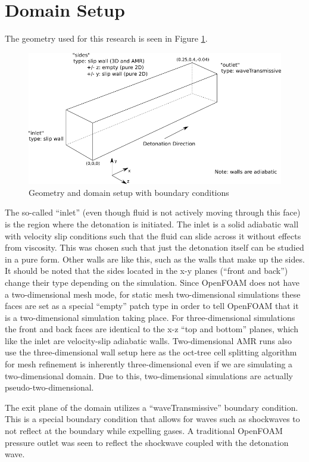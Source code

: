 \section{Domain Setup}
The geometry used for this research is seen in Figure \ref{fig:domainBC}.
\begin{figure}[H]
\centering
\includegraphics[width=\linewidth]{./figs/domainBC.png}
\caption{Geometry and domain setup with boundary conditions}
\label{fig:domainBC}
\end{figure}%
The so-called ``inlet'' (even though fluid is not actively moving through this face) is the region where the detonation is initiated. The inlet is a solid adiabatic wall with velocity slip conditions such that the fluid can slide across it without effects from viscosity. This was chosen such that just the detonation itself can be studied in a pure form. Other walls are like this, such as the walls that make up the sides. It should be noted that the sides located in the x-y planes (``front and back'') change their type depending on the simulation. Since OpenFOAM does not have a two-dimensional mesh mode, for static mesh two-dimensional simulations these faces are set as a special ``empty'' patch type in order to tell OpenFOAM that it is a two-dimensional simulation taking place. For three-dimensional simulations the front and back faces are identical to the x-z ``top and bottom'' planes, which like the inlet are velocity-slip adiabatic walls. Two-dimensional AMR runs also use the three-dimensional wall setup here as the oct-tree cell splitting algorithm for mesh refinement is inherently three-dimensional even if we are simulating a two-dimensional domain. Due to this, two-dimensional simulations are actually pseudo-two-dimensional. 

The exit plane of the domain utilizes a ``waveTransmissive'' boundary condition. This is a special boundary condition that allows for waves such as shockwaves to not reflect at the boundary while expelling gases. A traditional OpenFOAM pressure outlet was seen to reflect the shockwave coupled with the detonation wave. 

